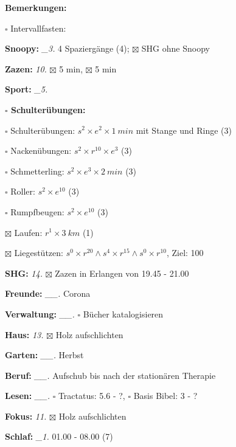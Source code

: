 \documentclass[10pt,a4paper]{article}
\newcommand\prop[1] {{\color {alizarin} {\bf #1}}}        %
\newcommand\mand[1] {{\color {burntorange} {\bf #1}}}     %
\newcommand\topspace{\vskip -15pt \hskip 20pt}
\newcommand\bottomspace{\vskip 4pt}
\newcommand\n[1] { {\sl #1.} \hskip 5pt }
\begin{document}
\begin{mdframed}[style=daystyle]
\begin{labeling}{{\mand {Bemerkungen:}}}
\begin{minipage}{0.75\textwidth}
\begin{labeling}{$\square$ Intervallfasten:}
      \end{labeling}
    \end{minipage}
      \bottomspace
  \item[{\mand {Snoopy:}}]        \n{\_3} 4 Spaziergänge (4); $\boxtimes$ SHG ohne Snoopy
  \item[{\mand {Zazen:}}]          \n{10} $\boxtimes$ 5 min, $\boxtimes$ 5 min
  \item[{\mand {Sport:}}]         \n{\_5}
    \topspace
    \begin{minipage}{0.75\textwidth}  
      \begin{labeling}{\prop {$\square$ {Schulterübungen:}}} 
        \setlength\itemsep{-3pt}
      \item[$\square$ Schulterübungen:] $s^2 \times e^2 \times 1\ min$ mit Stange und Ringe (3)
      \item[$\square$ Nackenübungen:]   $s^2 \times r^{10} \times e^3$ (3)
      \item[$\square$ Schmetterling:]   $s^2 \times e^3 \times 2\ min$ (3)
      \item[$\square$ Roller:]          $s^2 \times e^{10}$ (3)
      \item[$\square$ Rumpfbeugen:]     $s^2 \times e^{10}$ (3)
      \item[$\boxtimes$ Laufen:]        $r^1 \times 3\ km$ (1)
      \item[$\boxtimes$ Liegestützen:]  $s^0 \times r^{20} \land s^4 \times r^{15} \land s^0 \times r^{10}$, Ziel: 100
      \end{labeling}
    \end{minipage}
    \bottomspace        
  \item[{\mand {SHG:}}]            \n{14} $\boxtimes$ Zazen in Erlangen von 19.45 - 21.00
  \item[{\mand {Freunde:}}]      \n{\_\_} Corona
  \item[{\mand {Verwaltung:}}]   \n{\_\_} $\square$ Bücher katalogisieren
  \item[{\mand {Haus:}}]           \n{13} $\boxtimes$ Holz aufschlichten
  \item[{\mand {Garten:}}]       \n{\_\_} Herbst
  \item[{\mand {Beruf:}}]        \n{\_\_} Aufschub bis nach der stationären Therapie
  \item[{\mand {Lesen:}}]        \n{\_\_} $\square$ Tractatus: 5.6 - ?, $\square$ Basis Bibel: 3 - ?
  \item[{\mand {Fokus:}}]          \n{11} $\boxtimes$ Holz aufschlichten
  \item[{\mand {Schlaf:}}]        \n{\_1} 01.00 - 08.00 (7)

\end{labeling}
\end{mdframed}
\end{document}
